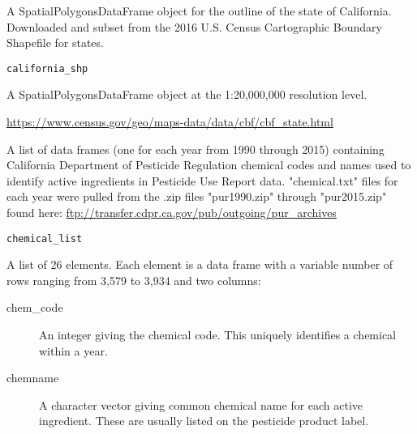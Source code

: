 \documentclass[a4paper]{book}
\begin{document}
%
\begin{Description}\relax
A SpatialPolygonsDataFrame object for the outline of the state of California.
Downloaded and subset from the 2016 U.S. Census Cartographic Boundary
Shapefile for states.
\end{Description}
%
\begin{Usage}
\begin{verbatim}
california_shp
\end{verbatim}
\end{Usage}
%
\begin{Format}
A SpatialPolygonsDataFrame object at the 1:20,000,000 resolution level.
\end{Format}
%
\begin{Source}\relax
\url{https://www.census.gov/geo/maps-data/data/cbf/cbf_state.html}
\end{Source}
%
\begin{Description}\relax
A list of data frames (one for each year from 1990 through 2015) containing
California Department of Pesticide Regulation chemical codes and names used
to identify active ingredients in Pesticide Use Report data. "chemical.txt"
files for each year were pulled from the .zip files "pur1990.zip" through
"pur2015.zip" found here:
\url{ftp://transfer.cdpr.ca.gov/pub/outgoing/pur_archives}
\end{Description}
%
\begin{Usage}
\begin{verbatim}
chemical_list
\end{verbatim}
\end{Usage}
%
\begin{Format}
A list of 26 elements. Each element is a data frame with a variable
number of rows ranging from 3,579 to 3,934 and two columns:
\begin{description}

\item[chem\_code] An integer giving the chemical code. This uniquely
identifies a chemical within a year.
\item[chemname] A character vector giving common chemical name for each
active ingredient. These are usually listed on the pesticide product
label.

\end{description}
\end{Format}
\end{document}
